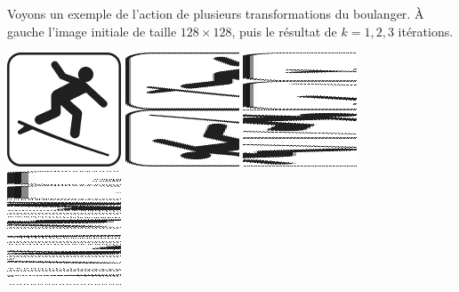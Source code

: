 \documentclass[11pt,class=report,crop=false]{standalone}
\begin{document}
\begin{cours}
Voyons un exemple de l'action de plusieurs transformations du boulanger.
À gauche l'image initiale de taille $128 \times 128$, puis le résultat de $k=1,2,3$ itérations. 
\begin{center}
\includegraphics[scale=0.6]{images_fiche/surf_gimp_new_boul_0.png}\qquad
\includegraphics[scale=0.6]{images_fiche/surf_gimp_new_boul_1.png}\qquad
\includegraphics[scale=0.6]{images_fiche/surf_gimp_new_boul_2.png}\qquad
\includegraphics[scale=0.6]{images_fiche/surf_gimp_new_boul_3.png}
\end{center}



\end{cours}
\end{document}
